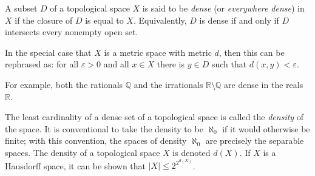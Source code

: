 \documentclass[12pt]{article}
\begin{document}
A subset $D$ of a topological space $X$
is said to be \emph{dense} (or \emph{everywhere dense}) in $X$
if the closure of $D$ is equal to $X$.
Equivalently, $D$ is dense if and only if
$D$ intersects every nonempty open set.

In the special case that $X$ is a metric space with metric $d$,
then this can be rephrased as:
for all $\varepsilon > 0$ and all $x\in X$
there is $y\in D$ such that $d(x,y)<\varepsilon$.

For example, both the rationals $\mathbb{Q}$
and the irrationals $\mathbb{R} \setminus \mathbb{Q}$
are dense in the reals $\mathbb{R}$.

The least cardinality of a dense set of a topological space
is called the \emph{density} of the space.
It is conventional to take the density to be $\aleph_0$
if it would otherwise be finite;
with this convention,
the spaces of density $\aleph_0$ are precisely the separable spaces.
The density of a topological space $X$ is denoted $d(X)$.
If $X$ is a Hausdorff space,
it can be shown that $|X| \le 2^{2^{d(X)}}$.
\end{document}
